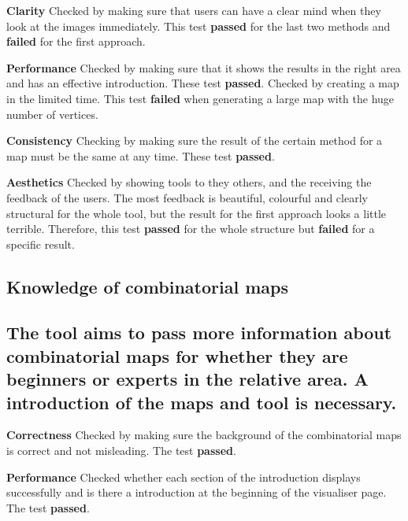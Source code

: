 \textbf{Clarity} Checked by making sure that users can have a clear mind when they look at the images immediately. This test \textbf{passed} for the last two methods and \textbf{failed} for the first approach.

\textbf{Performance} Checked by making sure that it shows the results in the right area and has an effective introduction. These test \textbf{passed}. Checked by creating a map in the limited time. This test \textbf{failed} when generating a large map with the huge number of vertices.

\textbf{Consistency} Checking by making sure the result of the certain method for a map must be the same at any time. These test \textbf{passed}.

\textbf{Aesthetics} Checked by showing tools to they others, and the receiving the feedback of the users. The most feedback is beautiful, colourful and clearly structural for the whole tool, but the result for the first approach looks a little terrible. Therefore, this test \textbf{passed} for the whole structure but \textbf{failed} for a specific result.

\subsection{Knowledge of combinatorial maps}

\subsection*{The tool aims to pass more information about combinatorial maps for whether they are beginners or experts in the relative area.  A introduction of the maps and tool is necessary.}

\textbf{Correctness} Checked by making sure the background of the combinatorial maps is correct and not misleading. The test \textbf{passed}.

\textbf{Performance} Checked whether each section of the introduction displays successfully and is there a introduction at the beginning of the visualiser page. The test \textbf{passed}.
